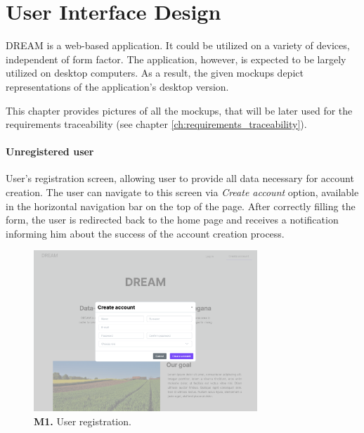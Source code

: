 \chapter{User Interface Design}

DREAM is a web-based application. It could be utilized on a variety of devices, independent of form factor. The application, however, is expected to be largely utilized on desktop computers. As a result, the given mockups depict representations of the application's desktop version.

This chapter provides pictures of all the  mockups, that will be later used for the requirements traceability (see chapter \ref{ch:requirements_traceability}).

\subsubsection{Unregistered user}

User's registration screen, allowing user to provide all data necessary for account creation. The user can navigate to this screen via \textit{Create account} option, available in the horizontal navigation bar on the top of the page. After correctly filling the form, the user is redirected back to the home page and receives a notification informing him about the success of the account creation process.
\begin{figure}[H]
\centering
\includegraphics[width=0.75\textwidth]{mockups/Unreg. user_Create account.png}
\caption{\textbf{M1.} User registration.}
\end{figure}

